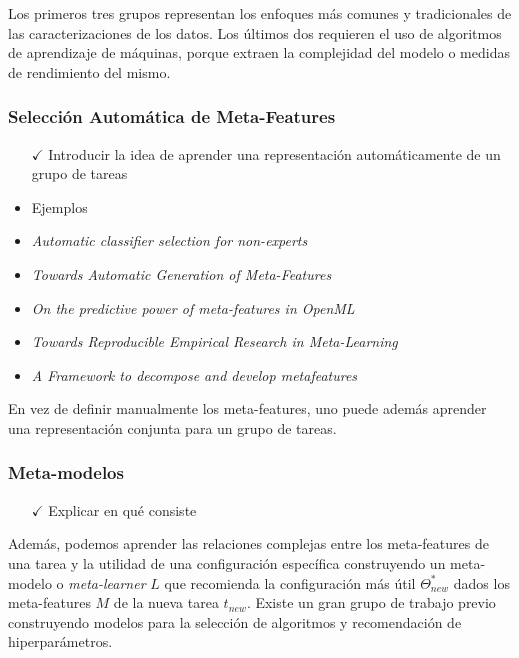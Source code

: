 Los primeros tres grupos representan los enfoques más comunes y tradicionales de las caracterizaciones de los datos. Los últimos dos requieren el uso de algoritmos de aprendizaje de máquinas, porque extraen la complejidad del modelo o medidas de rendimiento del mismo. 

\subsubsection{Selección Automática de Meta-Features}

\begin{itemize}
	\item[$\checkmark$] Introducir la idea de aprender una representación automáticamente de un grupo de tareas
	\item Ejemplos
	\item \textit{Automatic classifier selection for non-experts}
	\item \textit{Towards Automatic Generation of Meta-Features}
	\item \textit{On the predictive power of meta-features in OpenML}
	\item \textit{Towards Reproducible Empirical Research in Meta-Learning}
	\item \textit{A Framework to decompose and develop metafeatures}
\end{itemize}

En vez de definir manualmente los meta-features, uno puede además aprender una representación conjunta para un grupo de tareas. 

\subsubsection{Meta-modelos}

\begin{itemize}
	\item[$\checkmark$] Explicar en qué consiste
\end{itemize}

Además, podemos aprender las relaciones complejas entre los meta-features de una tarea y la utilidad de una configuración específica construyendo un meta-modelo o \textit{meta-learner} $L$ que recomienda la configuración más útil $\Theta_{new}^*$ dados los meta-features $M$ de la nueva tarea $t_{new}$. Existe un gran grupo de trabajo previo construyendo modelos para la selección de algoritmos y recomendación de hiperparámetros.

\quad

